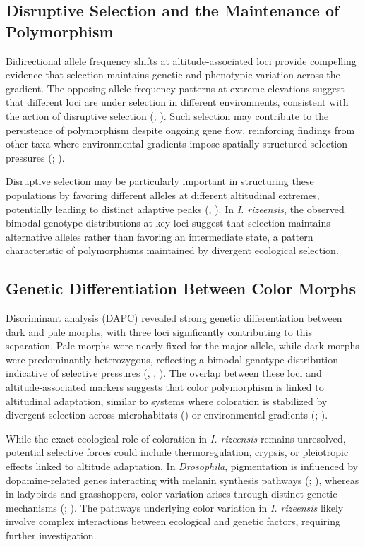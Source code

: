 \documentclass[9pt,a4paper,twoside]{rho-class/rho}
\begin{document}
\subsection{Disruptive Selection and the Maintenance of Polymorphism}

Bidirectional allele frequency shifts at altitude-associated loci provide compelling evidence that selection maintains genetic and phenotypic variation across the gradient. The opposing allele frequency patterns at extreme elevations suggest that different loci are under selection in different environments, consistent with the action of disruptive selection (\cite{White2021}; \cite{Wadgymar2022}). Such selection may contribute to the persistence of polymorphism despite ongoing gene flow, reinforcing findings from other taxa where environmental gradients impose spatially structured selection pressures (\cite{Tigano2016}; \cite{Zancolli2019}).

Disruptive selection may be particularly important in structuring these populations by favoring different alleles at different altitudinal extremes, potentially leading to distinct adaptive peaks (\cite{Berdahl2015}, \cite{Forester2016}). In \textit{I. rizeensis}, the observed bimodal genotype distributions at key loci suggest that selection maintains alternative alleles rather than favoring an intermediate state, a pattern characteristic of polymorphisms maintained by divergent ecological selection.

\subsection{Genetic Differentiation Between Color Morphs}

Discriminant analysis (DAPC) revealed strong genetic differentiation between dark and pale morphs, with three loci significantly contributing to this separation. Pale morphs were nearly fixed for the major allele, while dark morphs were predominantly heterozygous, reflecting a bimodal genotype distribution indicative of selective pressures (\cite{Prince2017}, \cite{Thompson2019}, \cite{PereiraMartins2022}). The overlap between these loci and altitude-associated markers suggests that color polymorphism is linked to altitudinal adaptation, similar to systems where coloration is stabilized by divergent selection across microhabitats (\cite{Villoutreix2023}) or environmental gradients (\cite{Mullen2008}; \cite{Wittkopp2003}).

While the exact ecological role of coloration in \textit{I. rizeensis} remains unresolved, potential selective forces could include thermoregulation, crypsis, or pleiotropic effects linked to altitude adaptation. In \textit{Drosophila}, pigmentation is influenced by dopamine-related genes interacting with melanin synthesis pathways (\cite{Wright1987}; \cite{Wittkopp2003}), whereas in ladybirds and grasshoppers, color variation arises through distinct genetic mechanisms (\cite{MICHIE2010}; \cite{Bastide2016}). The pathways underlying color variation in \textit{I. rizeensis} likely involve complex interactions between ecological and genetic factors, requiring further investigation.
\end{document}
